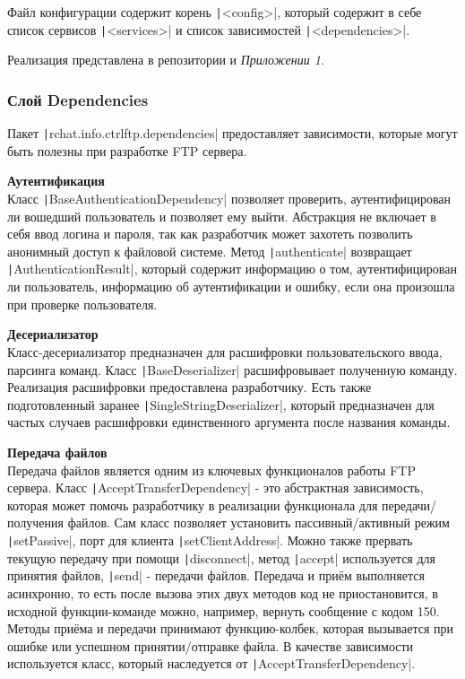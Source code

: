 \documentclass[a4paper,14pt]{extarticle}
\begin{document}
Файл конфигурации содержит корень \texttt|<config>|, который содержит в себе
список сервисов \texttt|<services>| и список зависимостей \texttt|<dependencies>|.

Реализация представлена в репозитории и \textit{Приложении 1}.

\subsubsection{Слой Dependencies}
Пакет \texttt|rchat.info.ctrlftp.dependencies| предоставляет зависимости, которые могут 
быть полезны при разработке FTP сервера. 

\textbf{Аутентификация}\\
Класс \texttt|BaseAuthenticationDependency| позволяет проверить, аутентифицирован ли вошедший
пользователь и позволяет ему выйти. Абстракция не включает в себя ввод логина и пароля, 
так как разработчик может захотеть позволить анонимный доступ к файловой системе. Метод 
\texttt|authenticate| возвращает \texttt|AuthenticationResult|, который содержит информацию
о том, аутентифицирован ли пользователь, информацию об аутентификации и ошибку, если она произошла
при проверке пользователя.

\textbf{Десериализатор}\\
Класс-десериализатор предназначен для расшифровки пользовательского ввода, парсинга команд. 
Класс \texttt|BaseDeserializer| расшифровывает полученную команду. Реализация 
расшифровки предоставлена разработчику. Есть также подготовленный заранее
\texttt|SingleStringDeserializer|, который предназначен для частых случаев
расшифровки единственного аргумента после названия команды.

\textbf{Передача файлов}\\
Передача файлов является одним из ключевых функционалов работы FTP сервера. Класс \texttt|AcceptTransferDependency| - 
это абстрактная зависимость, которая может помочь разработчику в реализации функционала для передачи/получения 
файлов. Сам класс позволяет установить пассивный/активный режим \texttt|setPassive|, порт для клиента
\texttt|setClientAddress|. Можно также прервать текущую передачу при помощи \texttt|disconnect|,
метод \texttt|accept| используется для принятия файлов, \texttt|send| - передачи файлов. 
Передача и приём выполняется асинхронно, то есть после вызова этих двух методов код не приостановится, в 
исходной функции-команде можно, например, вернуть сообщение с кодом 150. 
Методы приёма и передачи принимают функцию-колбек, которая вызывается при ошибке или успешном принятии/отправке
файла. В качестве зависимости используется класс, который наследуется от \texttt|AcceptTransferDependency|.
\end{document}
